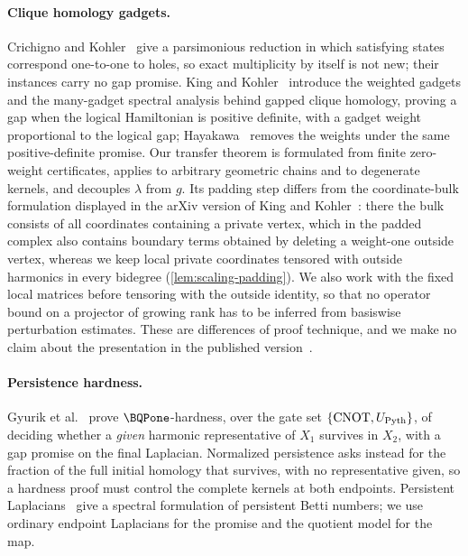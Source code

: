 \paragraph{Clique homology gadgets.}
Crichigno and Kohler~\cite{crichigno2024clique} give a parsimonious reduction
in which satisfying states correspond one-to-one to holes, so exact
multiplicity by itself is not new; their instances carry no gap promise.
King and Kohler~\cite{king2026gapped} introduce the weighted gadgets and the
many-gadget spectral analysis behind gapped clique homology, proving a gap
when the logical Hamiltonian is positive definite, with a gadget weight
proportional to the logical gap; Hayakawa~\cite{hayakawa2026unweighted}
removes the weights under the same positive-definite promise.  Our transfer
theorem is formulated from finite zero-weight certificates, applies to
arbitrary geometric chains and to degenerate kernels, and decouples
\(\lambda\) from \(g\).  Its padding step differs from the coordinate-bulk
formulation displayed in the arXiv version of King and
Kohler~\cite[Claim~10.2]{king2023gappedv2}: there the bulk consists of all
coordinates containing a private vertex, which in the padded complex also
contains boundary terms obtained by deleting a weight-one outside vertex,
whereas we keep local private coordinates tensored with outside harmonics
in every bidegree (\cref{lem:scaling-padding}).  We also work with the fixed
local matrices before tensoring with the outside identity, so that no
operator bound on a projector of growing rank has to be inferred from
basiswise perturbation estimates.  These are differences of proof technique,
and we make no claim about the presentation in the published
version~\cite{king2026gapped}.

\paragraph{Persistence hardness.}
Gyurik et al.~\cite{gyurik2026provable} prove \(\BQPone\)-hardness, over the
gate set \(\{\mathrm{CNOT},U_{\rm Pyth}\}\), of deciding whether a
\emph{given} harmonic representative of \(X_1\) survives in \(X_2\), with a
gap promise on the final Laplacian.  Normalized persistence asks instead for
the fraction of the full initial homology that survives, with no
representative given, so a hardness proof must control the complete kernels
at both endpoints.  Persistent Laplacians~\cite{memoli2022persistent} give a
spectral formulation of persistent Betti numbers; we use ordinary endpoint
Laplacians for the promise and the quotient model for the map.

